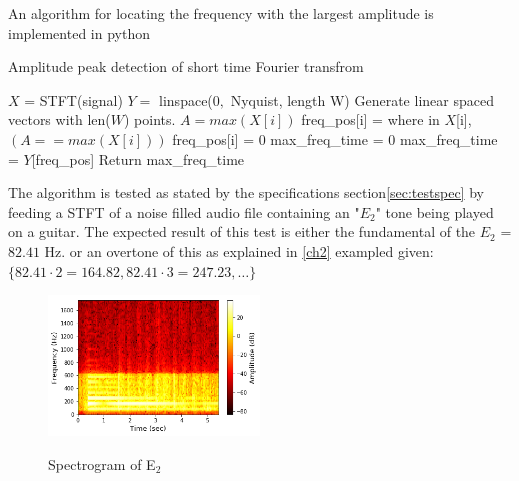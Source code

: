 An algorithm for locating the frequency with the largest amplitude is implemented in python 
\begin{algorithm}[H]
\caption{Amplitude peak detection of short time Fourier transfrom}
\label{alg:FIR}
\begin{algorithmic}[1] 
\State  $X$ = STFT(signal) 
\State $Y =$ linspace($0,$ Nyquist, length W) \Comment Generate linear spaced vectors with len($W$) points.
		\State $A = max(X[i])$ 
		 
			\State freq\_pos[i] = where in $X$[i], $(A == max(X[i]))$ 
		\Else
			\State freq\_pos[i] = 0	
		\EndIf
			\State max\_freq\_time = 0
		\Else
			\State max\_freq\_time = $Y$[freq\_pos]
		\EndIf
	\EndFor
	\State Return max\_freq\_time
\EndProcedure
\end{algorithmic}
\end{algorithm}

The algorithm is tested as stated by the specifications section\ref{sec:testspec} by feeding a STFT of a noise filled audio file containing an "$E_2$" tone being played on a guitar. 
The expected result of this test is either the fundamental of the $E_2$ = $82.41$ Hz. or an overtone of this as explained in \ref{ch2} exampled given: $\{82.41 \cdot 2 = 164.82, 82.41 \cdot 3 = 247.23, \dots \}$ 

\begin{figure}[H]
\centering 
\includegraphics[width=0.5\textwidth]{figures/peak_detection/20170511_spectogram_E_2.png}
\label{fig:spec_E_2}
\caption{Spectrogram of E$_2$}
\end{figure}


